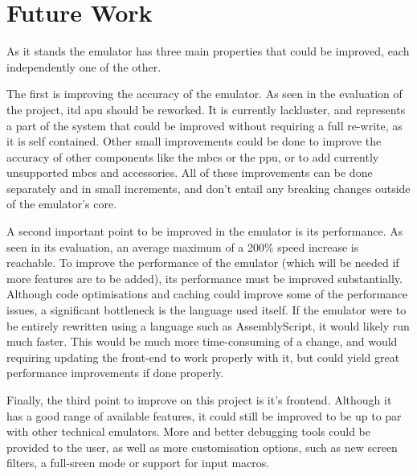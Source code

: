 \documentclass[11pt]{informatics-report}
\begin{document}
\section{Future Work}

As it stands the emulator has three main properties that could be improved, each independently one of the other.

The first is improving the accuracy of the emulator. As seen in the evaluation of the project, itd \gls{apu} should be reworked. It is currently lackluster, and represents a part of the system that could be improved without requiring a full re-write, as it is self contained. Other small improvements could be done to improve the accuracy of other components like the \glspl{mbc} or the \gls{ppu}, or to add currently unsupported \glspl{mbc} and accessories. All of these improvements can be done separately and in small increments, and don't entail any breaking changes outside of the emulator's core.

A second important point to be improved in the emulator is its performance. As seen in its evaluation, an average maximum of a 200\% speed increase is reachable. To improve the performance of the emulator (which will be needed if more features are to be added), its performance must be improved substantially. Although code optimisations and caching could improve some of the performance issues, a significant bottleneck is the language used itself. If the emulator were to be entirely rewritten using a language such as AssemblyScript, it would likely run much faster. This would be much more time-consuming of a change, and would requiring updating the front-end to work properly with it, but could yield great performance improvements if done properly.

Finally, the third point to improve on this project is it's frontend. Although it has a good range of available features, it could still be improved to be up to par with other technical emulators. More and better debugging tools could be provided to the user, as well as more customisation options, such as new screen filters, a full-sreen mode or support for input macros.

\clearpage

\printnoidxglossary[type=\acronymtype]

\printbibliography
{}
\end{document}
